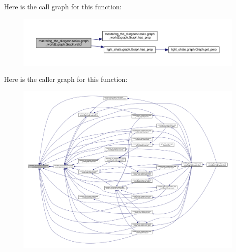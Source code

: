 Here is the call graph for this function\+:
\nopagebreak
\begin{figure}[H]
\begin{center}
\leavevmode
\includegraphics[width=350pt]{classmastering__the__dungeon_1_1tasks_1_1graph__world2_1_1graph_1_1Graph_a28bc1686c8844b4d8071db8b3bd1444a_cgraph}
\end{center}
\end{figure}
Here is the caller graph for this function\+:
\nopagebreak
\begin{figure}[H]
\begin{center}
\leavevmode
\includegraphics[width=350pt]{classmastering__the__dungeon_1_1tasks_1_1graph__world2_1_1graph_1_1Graph_a28bc1686c8844b4d8071db8b3bd1444a_icgraph}
\end{center}
\end{figure}
\mbox{\label{classmastering__the__dungeon_1_1tasks_1_1graph__world2_1_1graph_1_1Graph_a1a12d47f2f85ede7b8351ba138238bf2}} 
